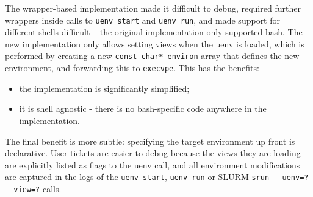 The wrapper-based implementation made it difficult to debug, required further wrappers inside calls to \lstinline{uenv start} and \lstinline{uenv run}, and made support for different shells difficult -- the original implementation only supported bash.
The new implementation only allows setting views when the uenv is loaded, which is performed by creating a new \lstinline{const char* environ} array that defines the new environment, and forwarding this to \lstinline{execvpe}.
This has the benefits:
\begin{itemize}
    \item the implementation is significantly simplified;
    \item it is shell agnostic - there is no bash-specific code anywhere in the implementation.
\end{itemize}

The final benefit is more subtle: specifying the target environment up front is declarative.
User tickets are easier to debug because the views they are loading are explicitly listed as flags to the uenv call, and all environment modifications are captured in the logs of the \lstinline{uenv start}, \lstinline{uenv run} or SLURM \lstinline{srun --uenv=? --view=?} calls.
